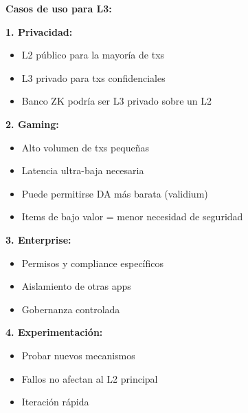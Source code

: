 \documentclass[11pt,a4paper,twoside,openright]{book}
\theoremstyle{definition}
\theoremstyle{plain}
\theoremstyle{remark}
\begin{document}
\begin{keyidea}
\textbf{Casos de uso para L3:}

\textbf{1. Privacidad:}
\begin{itemize}
    \item L2 público para la mayoría de txs
    \item L3 privado para txs confidenciales
    \item Banco ZK podría ser L3 privado sobre un L2
\end{itemize}

\textbf{2. Gaming:}
\begin{itemize}
    \item Alto volumen de txs pequeñas
    \item Latencia ultra-baja necesaria
    \item Puede permitirse DA más barata (validium)
    \item Items de bajo valor = menor necesidad de seguridad
\end{itemize}

\textbf{3. Enterprise:}
\begin{itemize}
    \item Permisos y compliance específicos
    \item Aislamiento de otras apps
    \item Gobernanza controlada
\end{itemize}

\textbf{4. Experimentación:}
\begin{itemize}
    \item Probar nuevos mecanismos
    \item Fallos no afectan al L2 principal
    \item Iteración rápida
\end{itemize}
\end{keyidea}
\end{document}
